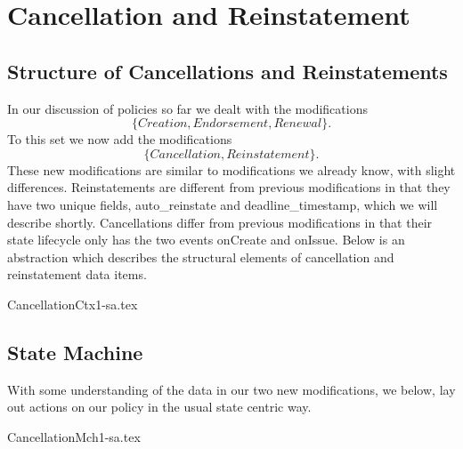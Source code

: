 \chapter{Cancellation and Reinstatement}
\label{intro:02} %


\section{Structure of Cancellations and Reinstatements}
\label{sec:02:1}
In our discussion of policies so far we dealt with the modifications
\begin{equation*}
  \{Creation, Endorsement, Renewal\}.
\end{equation*}
To this set we now add the modifications
\begin{equation*}
  \{Cancellation, Reinstatement\}.
\end{equation*}
These new modifications are similar to modifications we already
know, with slight differences. Reinstatements are different from previous modifications in that they have two unique
fields, auto\_reinstate and deadline\_timestamp, which we will describe shortly. Cancellations differ from previous
modifications in that their state lifecycle only has the two events onCreate and onIssue. Below is an abstraction which
describes the structural elements of cancellation and reinstatement data items.

{CancellationCtx1-sa.tex}

\section{State Machine}
\label{sec:02:2}
With some understanding of the data in our two new modifications, we below, lay out actions on our policy in the usual
state centric way. 

{CancellationMch1-sa.tex}

